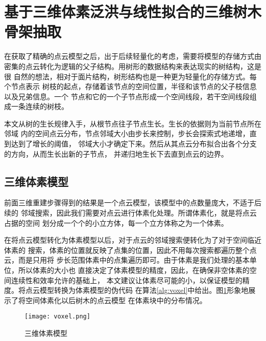 
\clearpage
\section{基于三维体素泛洪与线性拟合的三维树木骨架抽取}
\label{sec:sklextract}
在获取了精确的点云模型之后，出于后续轻量化的考虑，需要将模型的存储方式由
密集的点云转化为逻辑的父子结构。用树形的数据结构来表达现实的树结构，这是很
自然的想法，相对于面片结构，树形结构也是一种更为轻量化的存储方式。每个节点表示
树枝的起点，存储着该节点的空间位置，半径和该节点的父子枝信息以及兄弟信息。一个
节点和它的一个子节点形成一个空间线段，若干空间线段组成一条连续的树枝。

本文从树的生长规律入手，从根节点往子节点生长。生长的依据则为当前节点所在邻域
内的空间点云分布，节点邻域大小由步长来控制，步长会探索式地递增，直到达到了增长的阈值，
邻域大小才确定下来。然后从其点云分布拟合出各个分支的方向，从而生长出新的子节点，
并递归地生长下去直到点云的边界。

\subsection{三维体素模型}
前面三维重建步骤得到的结果是一个点云模型，该模型中的点数量庞大，不适于后续的
邻域搜索，因此我们需要对点云进行体素化处理。所谓体素化，就是将点云占据的空间
划分成一个个的小立方体，每一个立方体称之为一个体素。

在将点云模型转化为体素模型以后，对于点云的邻域搜索便转化为了对于空间临近体素的
搜索，体素的位置就反映了点集的位置，因此不用每次搜索都遍历整个点云，而是只用将
步长范围体素中的点集遍历即可。由于体素是我们处理的基本单位，所以体素的大小也
直接决定了体素模型的精度，因此，在确保非空体素的空间连续性和效率允许的基础上，
本文建议让体素尽可能的小，以保证模型的精度。将点云模型转换为体素模型的伪代码
在算法\ref{alg:voxel}中给出。图\ref{fig:voxel}形象地展示了将空间体素化以后树木的点云模型
在体素块中的分布情况。

\begin{figure}[H]
	\centering
	\texttt{[image: voxel.png]}
	\caption{三维体素模型}
	\label{fig:voxel}
\end{figure}


